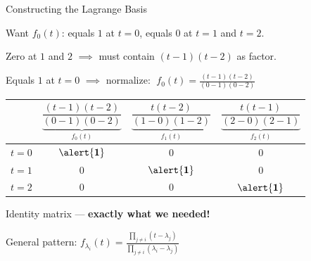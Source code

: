 \documentclass[10pt]{beamer}
\theoremstyle{definition}
\newcommand{\x}[1]{\alert{\textbf{#1}}}
\begin{document}
\begin{frame}{Constructing the Lagrange Basis}

Want $f_0(t)$: equals $1$ at $t = 0$, equals $0$ at $t = 1$ and $t = 2$.

\vfill

Zero at $1$ and $2$ $\implies$ must contain $(t-1)(t-2)$ as factor.

\medskip

Equals $1$ at $t = 0$ $\implies$ normalize: $\;\displaystyle f_0(t) = \frac{(t-1)(t-2)}{(0-1)(0-2)}$

\vfill\pause

{\small
\begin{center}
\renewcommand{\arraystretch}{1.2}
\begin{tabular}{c|ccc}
 & $\underbrace{\dfrac{(t-1)(t-2)}{(0-1)(0-2)}}_{f_0(t)}$
 & $\underbrace{\dfrac{t(t-2)}{(1-0)(1-2)}}_{f_1(t)}$
 & $\underbrace{\dfrac{t(t-1)}{(2-0)(2-1)}}_{f_2(t)}$ \\[4pt]
\hline
$t = 0$ & $\x{1}$ & $0$ & $0$ \\
$t = 1$ & $0$ & $\x{1}$ & $0$ \\
$t = 2$ & $0$ & $0$ & $\x{1}$
\end{tabular}
\end{center}
}

\vfill

Identity matrix --- \x{exactly what we needed!}

\vfill\pause

General pattern: $\displaystyle f_{\lambda_i}(t) = \frac{\prod_{j \neq i}(t - \lambda_j)}{\prod_{j \neq i}(\lambda_i - \lambda_j)}$

\end{frame}
\end{document}
